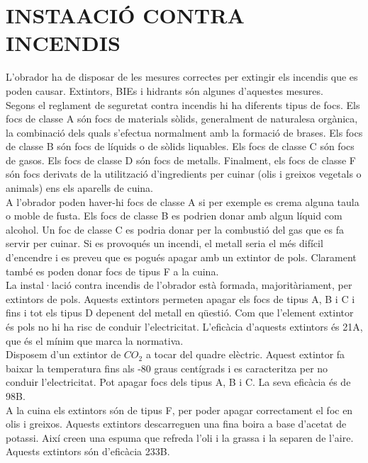 \section{\uppercase{Insta\Lgem ació contra incendis}}
L'obrador ha de disposar de les mesures correctes per extingir els incendis que es poden causar. Extintors, BIEs i hidrants són algunes d'aquestes mesures.\\ 
\newline Segons el reglament de seguretat contra incendis hi ha diferents tipus de focs. Els focs de classe A són focs de materials sòlids, generalment de naturalesa orgànica, la combinació dels quals s'efectua normalment amb la formació de brases. Els focs de classe B són focs de líquids o de sòlids liquables. Els focs de classe C són focs de gasos. Els focs de classe D són focs de metalls. Finalment, els focs de classe F són focs derivats de la utilització d'ingredients per cuinar (olis i greixos vegetals o animals) ens els aparells de cuina.\\
\newline A l'obrador poden haver-hi focs de classe A si per exemple es crema alguna taula o moble de fusta. Els focs de classe B es podrien donar amb algun líquid com alcohol. Un foc de classe C es podria donar per la combustió del gas que es fa servir per cuinar. Si es provoqués un incendi, el metall seria el més difícil d'encendre i es preveu que es pogués apagar amb un extintor de pols. Clarament també es poden donar focs de tipus F a la cuina. \\
\newline La instal·lació contra incendis de l'obrador està formada, majoritàriament, per extintors de pols. Aquests extintors permeten apagar els focs de tipus A, B i C i fins i tot els tipus D depenent del metall en qüestió. Com que l'element extintor és pols no hi ha risc de conduir l'electricitat. L'eficàcia d'aquests extintors és 21A, que és el mínim que marca la normativa.\\
\newline Disposem d'un extintor de $CO_2$ a tocar del quadre elèctric. Aquest extintor fa baixar la temperatura fins als -80 graus centígrads i es caracteritza per no conduir l'electricitat. Pot apagar focs dels tipus A, B i C. La seva eficàcia és de 98B.\\
\newline A la cuina els extintors són de tipus F, per poder apagar correctament el foc en olis i greixos. Aquests extintors descarreguen una fina boira a base d'acetat de potassi. Així creen una espuma que refreda l'oli i la grassa i la separen de l'aire. Aquests extintors són d'eficàcia 233B.\\
